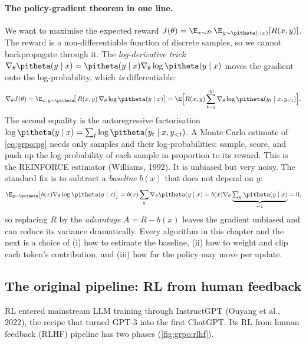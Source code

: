 \paragraph{The policy-gradient theorem in one line.} We want to maximise the expected
reward $J(\theta)=\E_{x\sim\mathcal{D}}\,\E_{y\sim\pitheta(\cdot\mid x)}[R(x,y)]$. The
reward is a non-differentiable function of discrete samples, so we cannot backpropagate
through it. The \emph{log-derivative trick}
$\nabla_\theta \pitheta(y\mid x)=\pitheta(y\mid x)\nabla_\theta\log\pitheta(y\mid x)$ moves
the gradient onto the log-probability, which \emph{is} differentiable:
\begin{equation}
\nabla_\theta J(\theta)
 = \E_{x,\,y\sim\pitheta}\!\big[\,R(x,y)\,\nabla_\theta\log\pitheta(y\mid x)\big]
 = \E\Big[R(x,y)\sum_{t=1}^{|y|}\nabla_\theta\log\pitheta(y_t\mid x,y_{<t})\Big].
\label{eq:grpo:pg}
\end{equation}
The second equality is the autoregressive factorisation
$\log\pitheta(y\mid x)=\sum_t\log\pitheta(y_t\mid x,y_{<t})$. A Monte Carlo estimate of
\cref{eq:grpo:pg} needs only samples and their log-probabilities: sample, score, and push
up the log-probability of each sample in proportion to its reward. This is the REINFORCE
estimator (Williams, 1992). It is unbiased but very noisy. The standard fix is to subtract a
\emph{baseline} $b(x)$ that does not depend on $y$:
\begin{equation}
\E_{y\sim\pitheta}\big[b(x)\nabla_\theta\log\pitheta(y\mid x)\big]
 = b(x)\sum_y\nabla_\theta\pitheta(y\mid x)
 = b(x)\nabla_\theta\underbrace{\textstyle\sum_y\pitheta(y\mid x)}_{=1}=0,
\end{equation}
so replacing $R$ by the \emph{advantage} $A=R-b(x)$ leaves the gradient unbiased and can
reduce its variance dramatically. Every algorithm in this chapter and the next is a choice
of (i) how to estimate the baseline, (ii) how to weight and clip each token's contribution,
and (iii) how far the policy may move per update.

\subsection{The original pipeline: RL from human feedback}\label{sec:grpo:rlhf}

RL entered mainstream LLM training through InstructGPT (Ouyang et al., 2022),
the recipe that turned GPT-3 into the first ChatGPT. Its RL from human feedback (RLHF)
pipeline has two phases (\cref{fig:grpo:rlhf}).

